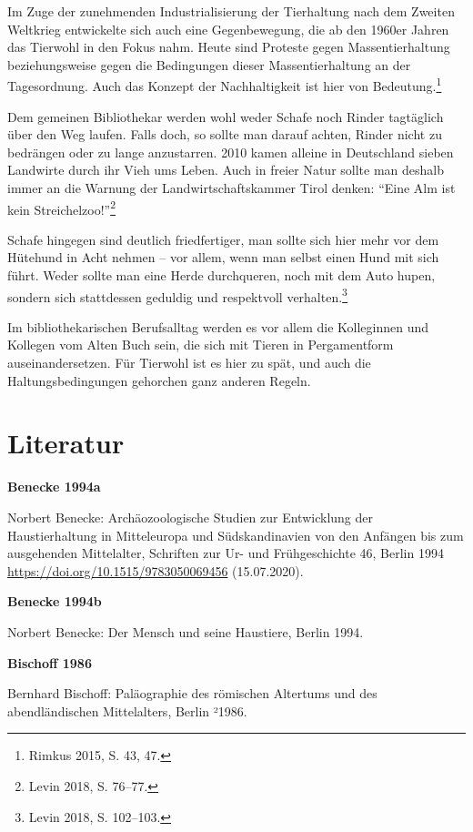 \documentclass[a4paper,
fontsize=11pt,
oneside,
numbers=noperiodatend,
parskip=half-,
bibliography=totoc,
final
]{scrartcl}
\begin{document}
Im Zuge der zunehmenden Industrialisierung der Tierhaltung nach dem
Zweiten Weltkrieg entwickelte sich auch eine Gegenbewegung, die ab den
1960er Jahren das Tierwohl in den Fokus nahm. Heute sind Proteste gegen
Massentierhaltung beziehungsweise gegen die Bedingungen dieser
Massentierhaltung an der Tagesordnung. Auch das Konzept der
Nachhaltigkeit ist hier von Bedeutung.\footnote{Rimkus 2015, S. 43, 47.}

Dem gemeinen Bibliothekar werden wohl weder Schafe noch Rinder
tagtäglich über den Weg laufen. Falls doch, so sollte man darauf achten,
Rinder nicht zu bedrängen oder zu lange anzustarren. 2010 kamen alleine
in Deutschland sieben Landwirte durch ihr Vieh ums Leben. Auch in freier
Natur sollte man deshalb immer an die Warnung der Landwirtschaftskammer
Tirol denken: \enquote{Eine Alm ist kein Streichelzoo!}\footnote{Levin
  2018, S. 76--77.}

Schafe hingegen sind deutlich friedfertiger, man sollte sich hier mehr
vor dem Hütehund in Acht nehmen -- vor allem, wenn man selbst einen Hund
mit sich führt. Weder sollte man eine Herde durchqueren, noch mit dem
Auto hupen, sondern sich stattdessen geduldig und respektvoll
verhalten.\footnote{Levin 2018, S. 102--103.}

Im bibliothekarischen Berufsalltag werden es vor allem die Kolleginnen
und Kollegen vom Alten Buch sein, die sich mit Tieren in Pergamentform
auseinandersetzen. Für Tierwohl ist es hier zu spät, und auch die
Haltungsbedingungen gehorchen ganz anderen Regeln.

\hypertarget{literatur}{%
\section{Literatur}\label{literatur}}

\textbf{Benecke 1994a}

Norbert Benecke: Archäozoologische Studien zur Entwicklung der
Haustierhaltung in Mitteleuropa und Südskandinavien von den Anfängen bis
zum ausgehenden Mittelalter, Schriften zur Ur- und Frühgeschichte 46,
Berlin 1994 \url{https://doi.org/10.1515/9783050069456} (15.07.2020).

\textbf{Benecke 1994b}

Norbert Benecke: Der Mensch und seine Haustiere, Berlin 1994.

\textbf{Bischoff 1986}

Bernhard Bischoff: Paläographie des römischen Altertums und des
abendländischen Mittelalters, Berlin ²1986.
\end{document}
